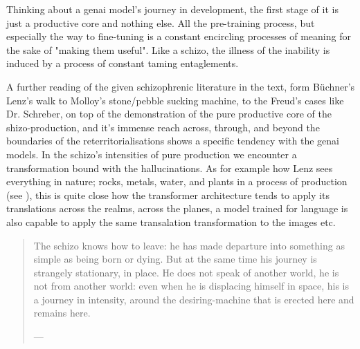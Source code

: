 Thinking about a \gls{genai} model's journey in development, the first stage of
it is just a productive core and nothing else. All the pre-training process,
but especially the way to fine-tuning is a constant encircling processes of
meaning for the sake of "making them useful". Like a schizo, the illness of the
inability is induced by a process of constant taming entaglements.


\begin{orangebox}
	A further reading of the given schizophrenic literature in the text, form
	Büchner's Lenz's walk to Molloy's stone/pebble sucking machine, to the Freud's
	cases like Dr. Schreber, on top of the demonstration of the pure productive
	core of the shizo-production, and it's immense reach across, through, and
	beyond the boundaries of the reterritorialisations shows a specific tendency
	with the \gls{genai} models. In the schizo's intensities of pure production we
	encounter a transformation bound with the hallucinations. As for example how Lenz sees everything in nature; rocks, metals, water, and plants in a process of production (see \cite[41]{buchanan2008b}), this is quite close how the transformer architecture tends to apply its translations across the realms, across the planes, a model trained for language is also capable to apply the same transalation transformation to the images etc.
\end{orangebox}




\begin{quote}
	The schizo knows how to leave: he has made departure into something as simple as being born or dying. But at the same time his journey is strangely stationary, in place. He does not speak of another world, he is not from another world: even when he is displacing himself in space, his is a journey in intensity, around the desiring-machine that is erected here and remains here.

	— \cite[131]{deleuze1983}
\end{quote}



